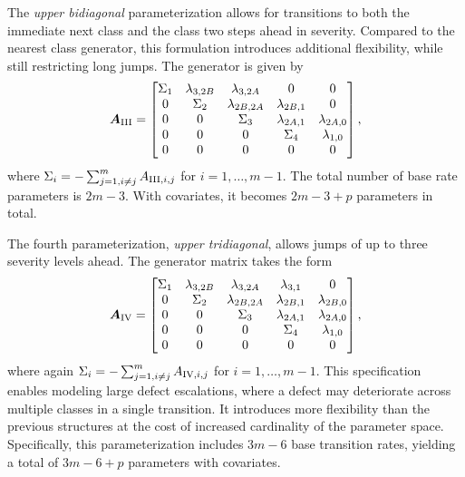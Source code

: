 The \textit{upper bidiagonal} parameterization allows for transitions to both the immediate next class and the class two steps ahead in severity. Compared to the nearest class generator, this formulation introduces additional flexibility, while still restricting long jumps. The generator is given by
\begin{align}
\bm{A}_{\RN{3}} = \begin{bmatrix}
\Sigma_1 & \lambda_{3,2B} & \lambda_{3,2A} & 0 & 0 \\
0 & \Sigma_2 & \lambda_{2B,2A} & \lambda_{2B,1} & 0 \\
0 & 0 & \Sigma_3 & \lambda_{2A,1} & \lambda_{2A,0} \\
0 & 0 & 0 & \Sigma_4 & \lambda_{1,0} \\
0 & 0 & 0 & 0 & 0 \\
\end{bmatrix}, \label{eq:generator_bidiagonal}
\end{align}
where $\Sigma_i = -\sum_{j=1, i \neq j}^m A_{\RN{3},i,j}$ for $i = 1, \dots, m-1$.
The total number of base rate parameters is $2m - 3$. With covariates, it becomes $2m - 3 + p$ parameters in total.

The fourth parameterization, \textit{upper tridiagonal}, allows jumps of up to three severity levels ahead. The generator matrix takes the form
\begin{align}
\bm{A}_{\RN{4}}= \begin{bmatrix}
\Sigma_1 & \lambda_{3,2B} & \lambda_{3,2A} & \lambda_{3,1} & 0 \\
0 & \Sigma_2 & \lambda_{2B,2A} & \lambda_{2B,1} & \lambda_{2B,0} \\
0 & 0 & \Sigma_3 & \lambda_{2A,1} & \lambda_{2A,0} \\
0 & 0 & 0 & \Sigma_4 & \lambda_{1,0} \\
0 & 0 & 0 & 0 & 0 \\
\end{bmatrix}, \label{eq:generator_tridiagonal}
\end{align}
where again $\Sigma_i = -\sum_{j=1, i \neq j}^m A_{\RN{4},i,j}$ for $i = 1, \dots, m-1$.
This specification enables modeling large defect escalations, where a defect may deteriorate across multiple classes in a single transition. It introduces more flexibility than the previous structures at the cost of increased cardinality of the parameter space. Specifically, this parameterization includes $3m - 6$ base transition rates, yielding a total of $3m - 6 + p$ parameters with covariates.


